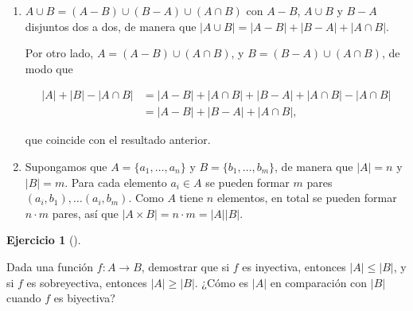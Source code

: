 \documentclass[
  spanish,
  a4paper,
]{scrreport}
\theoremstyle{definition}
\newtheorem{exercise}{Ejercicio}[chapter]
\theoremstyle{remark}
\begin{document}
\begin{tcolorbox}[enhanced jigsaw, arc=.35mm, bottomrule=.15mm, bottomtitle=1mm, breakable, colback=white, colbacktitle=quarto-callout-tip-color!10!white, colframe=quarto-callout-tip-color-frame, coltitle=black, left=2mm, leftrule=.75mm, opacityback=0, opacitybacktitle=0.6, rightrule=.15mm, title=\textcolor{quarto-callout-tip-color}{\faLightbulb}\hspace{0.5em}{Solución}, titlerule=0mm, toprule=.15mm, toptitle=1mm]

\begin{enumerate}
\def\labelenumi{\alph{enumi}.}
\item
  \(A\cup B = (A-B) \cup (B-A)\cup (A\cap B)\) con \(A-B\), \(A\cup B\)
  y \(B-A\) disjuntos dos a dos, de manera que
  \(|A\cup B| = |A-B| + |B-A| + |A\cap B|\).

  Por otro lado, \(A=(A-B)\cup (A\cap B)\), y \(B=(B-A)\cup (A\cap B)\),
  de modo que

  \begin{align*}
   |A| + |B| - |A\cap B| &= |A-B| + |A\cap B| + |B-A| + |A\cap B| - |A\cap B| \\
   &= |A-B| + |B-A| + |A\cap B|,
   \end{align*}

  que coincide con el resultado anterior.
\item
  Supongamos que \(A=\{a_1,\ldots, a_n\}\) y \(B=\{b_1,\ldots, b_m\}\),
  de manera que \(|A|=n\) y \(|B|=m\). Para cada elemento \(a_i\in A\)
  se pueden formar \(m\) pares \((a_i,b_1),\ldots (a_i,b_m)\). Como
  \(A\) tiene \(n\) elementos, en total se pueden formar \(n\cdot m\)
  pares, así que \(|A\times B| = n\cdot m = |A||B|\).
\end{enumerate}

\end{tcolorbox}

\begin{exercise}[]\protect\hypertarget{exr-cardinal-funcion-inyectiva-sobreyectiva}{}\label{exr-cardinal-funcion-inyectiva-sobreyectiva}

Dada una función \(f:A\rightarrow B\), demostrar que si \(f\) es
inyectiva, entonces \(|A|\leq |B|\), y si \(f\) es sobreyectiva,
entonces \(|A|\geq |B|\). ¿Cómo es \(|A|\) en comparación con \(|B|\)
cuando \(f\) es biyectiva?

\end{exercise}
\end{document}
